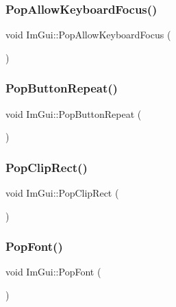 \mbox{\label{namespace_im_gui_a017db69016de97685aec978e504dc96d}} 
\subsubsection{\texorpdfstring{Pop\+Allow\+Keyboard\+Focus()}{PopAllowKeyboardFocus()}}
{\footnotesize\ttfamily void Im\+Gui\+::\+Pop\+Allow\+Keyboard\+Focus (\begin{DoxyParamCaption}{ }\end{DoxyParamCaption})}

\mbox{\label{namespace_im_gui_a0f883e8507be797ca8ba1448d2b9dbb0}} 
\subsubsection{\texorpdfstring{Pop\+Button\+Repeat()}{PopButtonRepeat()}}
{\footnotesize\ttfamily void Im\+Gui\+::\+Pop\+Button\+Repeat (\begin{DoxyParamCaption}{ }\end{DoxyParamCaption})}

\mbox{\label{namespace_im_gui_aef1c8a6e5a3c70cb10d03d2a2a66dfd8}} 
\subsubsection{\texorpdfstring{Pop\+Clip\+Rect()}{PopClipRect()}}
{\footnotesize\ttfamily void Im\+Gui\+::\+Pop\+Clip\+Rect (\begin{DoxyParamCaption}{ }\end{DoxyParamCaption})}

\mbox{\label{namespace_im_gui_af66649bc37022bf3cf2496c73af9a499}} 
\subsubsection{\texorpdfstring{Pop\+Font()}{PopFont()}}
{\footnotesize\ttfamily void Im\+Gui\+::\+Pop\+Font (\begin{DoxyParamCaption}{ }\end{DoxyParamCaption})}

